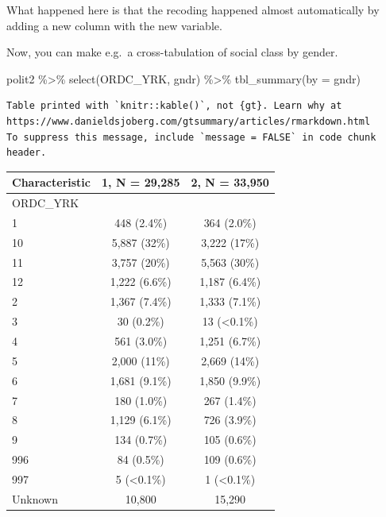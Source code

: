 \documentclass[
  letterpaper,
  DIV=11,
  numbers=noendperiod]{scrreprt}
\newenvironment{Shaded}{\begin{snugshade}}{\end{snugshade}}
\newcommand{\AttributeTok}[1]{\textcolor[rgb]{0.40,0.45,0.13}{#1}}
\newcommand{\FunctionTok}[1]{\textcolor[rgb]{0.28,0.35,0.67}{#1}}
\newcommand{\NormalTok}[1]{\textcolor[rgb]{0.00,0.23,0.31}{#1}}
\newcommand{\SpecialCharTok}[1]{\textcolor[rgb]{0.37,0.37,0.37}{#1}}
\theoremstyle{definition}
\theoremstyle{remark}
\begin{document}
What happened here is that the recoding happened almost automatically by
adding a new column with the new variable.

Now, you can make e.g.~a cross-tabulation of social class by gender.

\begin{Shaded}
\begin{Highlighting}[]
\NormalTok{polit2 }\SpecialCharTok{\%\textgreater{}\%} 
  \FunctionTok{select}\NormalTok{(ORDC\_YRK, gndr) }\SpecialCharTok{\%\textgreater{}\%} 
  \FunctionTok{tbl\_summary}\NormalTok{(}\AttributeTok{by =}\NormalTok{ gndr)}
\end{Highlighting}
\end{Shaded}

\begin{verbatim}
Table printed with `knitr::kable()`, not {gt}. Learn why at
https://www.danieldsjoberg.com/gtsummary/articles/rmarkdown.html
To suppress this message, include `message = FALSE` in code chunk header.
\end{verbatim}

\begin{longtable}[]{@{}lcc@{}}
\toprule()
\textbf{Characteristic} & \textbf{1}, N = 29,285 & \textbf{2}, N =
33,950 \\
\midrule()
\endhead
ORDC\_YRK & & \\
1 & 448 (2.4\%) & 364 (2.0\%) \\
10 & 5,887 (32\%) & 3,222 (17\%) \\
11 & 3,757 (20\%) & 5,563 (30\%) \\
12 & 1,222 (6.6\%) & 1,187 (6.4\%) \\
2 & 1,367 (7.4\%) & 1,333 (7.1\%) \\
3 & 30 (0.2\%) & 13 (\textless0.1\%) \\
4 & 561 (3.0\%) & 1,251 (6.7\%) \\
5 & 2,000 (11\%) & 2,669 (14\%) \\
6 & 1,681 (9.1\%) & 1,850 (9.9\%) \\
7 & 180 (1.0\%) & 267 (1.4\%) \\
8 & 1,129 (6.1\%) & 726 (3.9\%) \\
9 & 134 (0.7\%) & 105 (0.6\%) \\
996 & 84 (0.5\%) & 109 (0.6\%) \\
997 & 5 (\textless0.1\%) & 1 (\textless0.1\%) \\
Unknown & 10,800 & 15,290 \\
\bottomrule()
\end{longtable}
\end{document}
